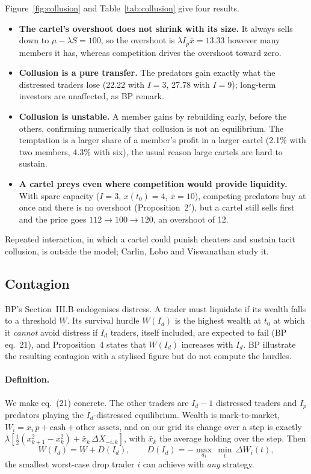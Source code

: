 \documentclass[11pt,a4paper]{article}
\newcommand{\xbar}{\bar x}
\begin{document}
Figure~\ref{fig:collusion} and Table~\ref{tab:collusion} give four results.
\begin{itemize}
  \item \textbf{The cartel's overshoot does not shrink with its size.} It always sells down
        to $\mu - \lambda S = 100$, so the overshoot is $\lambda I_p \xbar = 13.33$ however
        many members it has, whereas competition drives the overshoot toward zero.
  \item \textbf{Collusion is a pure transfer.} The predators gain exactly what the
        distressed traders lose (22.22 with $I = 3$, 27.78 with $I = 9$); long-term investors
        are unaffected, as BP remark.
  \item \textbf{Collusion is unstable.} A member gains by rebuilding early, before the
        others, confirming numerically that collusion is not an equilibrium. The temptation
        is a larger share of a member's profit in a larger cartel (2.1\% with two members,
        4.3\% with six), the usual reason large cartels are hard to sustain.
  \item \textbf{A cartel preys even where competition would provide liquidity.} With
        spare capacity ($I = 3$, $x(t_0) = 4$, $\xbar = 10$), competing predators buy at once
        and there is no overshoot (Proposition~2$'$), but a cartel still sells first and the
        price goes $112 \to 100 \to 120$, an overshoot of 12.
\end{itemize}
Repeated interaction, in which a cartel could punish cheaters and sustain tacit collusion,
is outside the model; Carlin, Lobo and Viswanathan \cite{clv2007} study it.

\subsection{Contagion}
BP's Section~III.B endogenises distress. A trader must liquidate if its wealth falls to a
threshold $\underline W$. Its survival hurdle $W(I_d)$ is the highest wealth at $t_0$ at
which it \emph{cannot} avoid distress if $I_d$ traders, itself included, are expected to
fail (BP eq.~21), and Proposition~4 states that $W(I_d)$ increases with $I_d$. BP illustrate
the resulting contagion with a stylised figure but do not compute the hurdles.

\paragraph{Definition.} We make eq.~(21) concrete. The other traders are $I_d - 1$ distressed
traders and $I_p$ predators playing the $I_d$-distressed equilibrium. Wealth is
mark-to-market, $W_i = x_i\,p + \text{cash} + \text{other assets}$, and on our grid its change
over a step is exactly $\lambda[\tfrac12(x_{k+1}^2 - x_k^2) + \bar x_k\,\Delta X_{-i,k}]$,
with $\bar x_k$ the average holding over the step. Then
\[
  W(I_d) = \underline W + D(I_d), \qquad
  D(I_d) = -\max_{a_i}\,\min_t\,\Delta W_i(t),
\]
the smallest worst-case drop trader $i$ can achieve with \emph{any} strategy.
\end{document}
